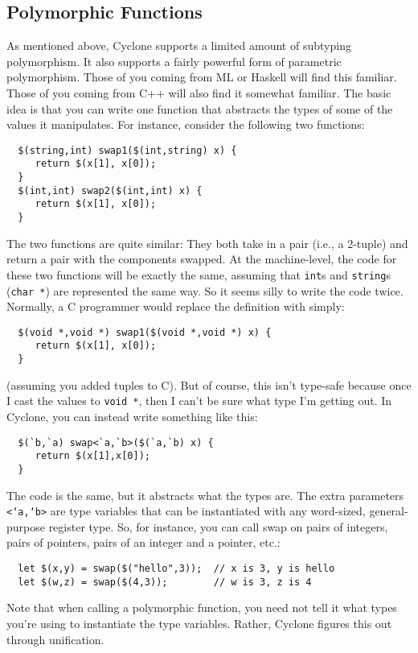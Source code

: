\subsection{Polymorphic Functions}
As mentioned above, Cyclone supports a limited amount of subtyping
polymorphism.  It also supports a fairly powerful form of parametric
polymorphism.  Those of you coming from ML or Haskell will find this
familiar.  Those of you coming from C++ will also find it somewhat
familiar.  The basic idea is that you can write one function that
abstracts the types of some of the values it manipulates.  For
instance, consider the following two functions:
\begin{verbatim}
  $(string,int) swap1($(int,string) x) {
     return $(x[1], x[0]);
  }
  $(int,int) swap2($(int,int) x) {
     return $(x[1], x[0]);
  }
\end{verbatim}

The two functions are quite similar: They both take in a pair (i.e., a
2-tuple) and return a pair with the components swapped.  At the
machine-level, the code for these two functions will be exactly the
same, assuming that \texttt{int}s and \texttt{string}s (\texttt{char *}) are
represented the same way.  So it seems silly to write the code twice.
Normally, a C programmer would replace the definition with simply:
\begin{verbatim}
  $(void *,void *) swap1($(void *,void *) x) {
     return $(x[1], x[0]);
  }
\end{verbatim}
(assuming you added tuples to C).  But of course, this isn't type-safe
because once I cast the values to \texttt{void *}, then I can't be sure
what type I'm getting out.  In Cyclone, you can instead write
something like this:
\begin{verbatim}
  $(`b,`a) swap<`a,`b>($(`a,`b) x) {
     return $(x[1],x[0]);
  }
\end{verbatim}
The code is the same, but it abstracts what the types are.  The extra
parameters \texttt{<`a,`b>} are type variables that can be instantiated
with any word-sized, general-purpose register type.  So, for instance,
you can call swap on pairs of integers, pairs of pointers, pairs of an
integer and a pointer, etc.:
\begin{verbatim}
  let $(x,y) = swap($("hello",3));  // x is 3, y is hello
  let $(w,z) = swap($(4,3));        // w is 3, z is 4
\end{verbatim}

Note that when calling a polymorphic function, you need not tell it
what types you're using to instantiate the type variables.  Rather,
Cyclone figures this out through unification.

